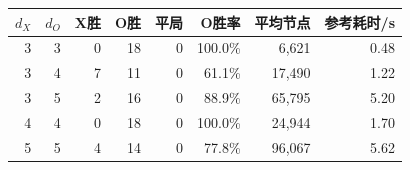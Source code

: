 \begin{tabular}{rrrrrrrr}
\toprule
$d_X$ & $d_O$ & X胜 & O胜 & 平局 & O胜率 & 平均节点 & 参考耗时/s \\
\midrule
3 & 3 & 0 & 18 & 0 & 100.0\% & 6,621 & 0.48 \\
3 & 4 & 7 & 11 & 0 & 61.1\% & 17,490 & 1.22 \\
3 & 5 & 2 & 16 & 0 & 88.9\% & 65,795 & 5.20 \\
4 & 4 & 0 & 18 & 0 & 100.0\% & 24,944 & 1.70 \\
5 & 5 & 4 & 14 & 0 & 77.8\% & 96,067 & 5.62 \\
\bottomrule
\end{tabular}
